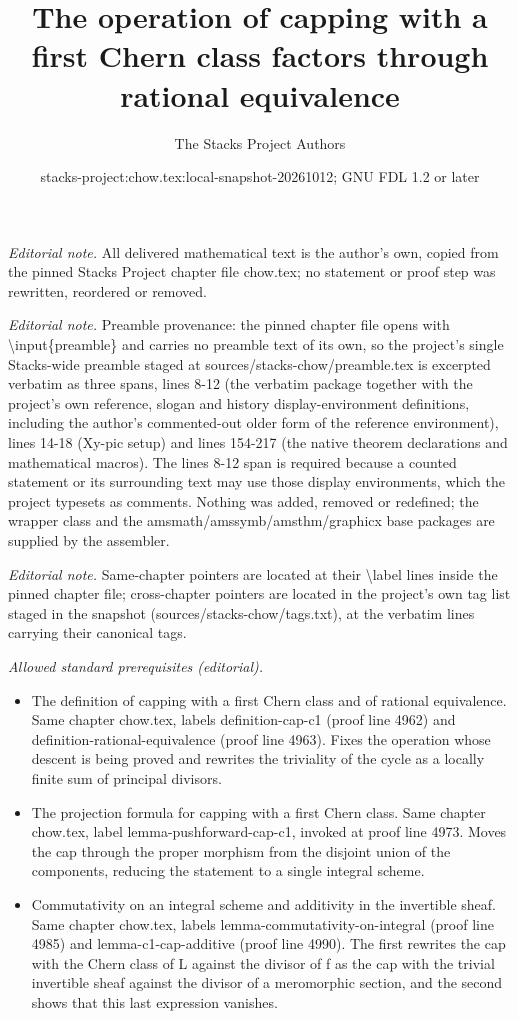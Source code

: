 \documentclass[10pt,a4paper]{amsart}
\title{The operation of capping with a first Chern class factors through rational equivalence}
\author{The Stacks Project Authors}
\date{stacks-project:chow.tex:local-snapshot-20261012; GNU FDL 1.2 or later}
\theoremstyle{plain}
\theoremstyle{definition}
\theoremstyle{remark}
\numberwithin{equation}{subsection}
\begin{document}
\maketitle
\noindent\textit{Editorial note.} All delivered mathematical text is the author's own, copied from the pinned Stacks Project chapter file chow.tex; no statement or proof step was rewritten, reordered or removed.\par\medskip
\noindent\textit{Editorial note.} Preamble provenance: the pinned chapter file opens with \textbackslash{}input\{preamble\} and carries no preamble text of its own, so the project's single Stacks-wide preamble staged at sources/stacks-chow/preamble.tex is excerpted verbatim as three spans, lines 8-12 (the verbatim package together with the project's own reference, slogan and history display-environment definitions, including the author's commented-out older form of the reference environment), lines 14-18 (Xy-pic setup) and lines 154-217 (the native theorem declarations and mathematical macros). The lines 8-12 span is required because a counted statement or its surrounding text may use those display environments, which the project typesets as comments. Nothing was added, removed or redefined; the wrapper class and the amsmath/amssymb/amsthm/graphicx base packages are supplied by the assembler.\par\medskip
\noindent\textit{Editorial note.} Same-chapter pointers are located at their \textbackslash{}label lines inside the pinned chapter file; cross-chapter pointers are located in the project's own tag list staged in the snapshot (sources/stacks-chow/tags.txt), at the verbatim lines carrying their canonical tags.\par\medskip
\noindent\textit{Allowed standard prerequisites (editorial).}\begin{itemize}
\item The definition of capping with a first Chern class and of rational equivalence. Same chapter chow.tex, labels definition-cap-c1 (proof line 4962) and definition-rational-equivalence (proof line 4963). Fixes the operation whose descent is being proved and rewrites the triviality of the cycle as a locally finite sum of principal divisors.
\item The projection formula for capping with a first Chern class. Same chapter chow.tex, label lemma-pushforward-cap-c1, invoked at proof line 4973. Moves the cap through the proper morphism from the disjoint union of the components, reducing the statement to a single integral scheme.
\item Commutativity on an integral scheme and additivity in the invertible sheaf. Same chapter chow.tex, labels lemma-commutativity-on-integral (proof line 4985) and lemma-c1-cap-additive (proof line 4990). The first rewrites the cap with the Chern class of L against the divisor of f as the cap with the trivial invertible sheaf against the divisor of a meromorphic section, and the second shows that this last expression vanishes.
\end{itemize}\medskip
\end{document}
